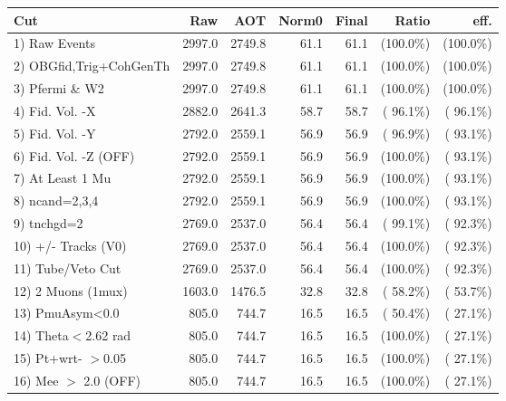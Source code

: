  \begin{table}[h!]\centering
 \begin{tabular}{||l||r|r|r|r|r|r||}
 \hline
 \hline
 Cut & Raw & AOT & Norm0 & Final & Ratio & eff.       \\
 \hline
  1) Raw Events           &       2997.0 &       2749.8 &         61.1 &         61.1 & (100.0\%) & (100.0\%) \\
  2) OBGfid,Trig+CohGenTh &       2997.0 &       2749.8 &         61.1 &         61.1 & (100.0\%) & (100.0\%) \\
  3) Pfermi \& W2         &       2997.0 &       2749.8 &         61.1 &         61.1 & (100.0\%) & (100.0\%) \\
  4) Fid. Vol. -X         &       2882.0 &       2641.3 &         58.7 &         58.7 & ( 96.1\%) & ( 96.1\%) \\
  5) Fid. Vol. -Y         &       2792.0 &       2559.1 &         56.9 &         56.9 & ( 96.9\%) & ( 93.1\%) \\
  6) Fid. Vol. -Z (OFF)   &       2792.0 &       2559.1 &         56.9 &         56.9 & (100.0\%) & ( 93.1\%) \\
  7) At Least 1 Mu        &       2792.0 &       2559.1 &         56.9 &         56.9 & (100.0\%) & ( 93.1\%) \\
  8) ncand=2,3,4          &       2792.0 &       2559.1 &         56.9 &         56.9 & (100.0\%) & ( 93.1\%) \\
  9) tnchgd=2             &       2769.0 &       2537.0 &         56.4 &         56.4 & ( 99.1\%) & ( 92.3\%) \\
 10) +/- Tracks (V0)      &       2769.0 &       2537.0 &         56.4 &         56.4 & (100.0\%) & ( 92.3\%) \\
 11) Tube/Veto Cut        &       2769.0 &       2537.0 &         56.4 &         56.4 & (100.0\%) & ( 92.3\%) \\
 12) 2 Muons (1mux)       &       1603.0 &       1476.5 &         32.8 &         32.8 & ( 58.2\%) & ( 53.7\%) \\
 13) PmuAsym<0.0          &        805.0 &        744.7 &         16.5 &         16.5 & ( 50.4\%) & ( 27.1\%) \\
 14) Theta$<$2.62 rad     &        805.0 &        744.7 &         16.5 &         16.5 & (100.0\%) & ( 27.1\%) \\
 15) Pt+wrt- $>$0.05      &        805.0 &        744.7 &         16.5 &         16.5 & (100.0\%) & ( 27.1\%) \\
 16) Mee $>$ 2.0  (OFF)   &        805.0 &        744.7 &         16.5 &         16.5 & (100.0\%) & ( 27.1\%) \\

\end{tabular}
\end{table}
